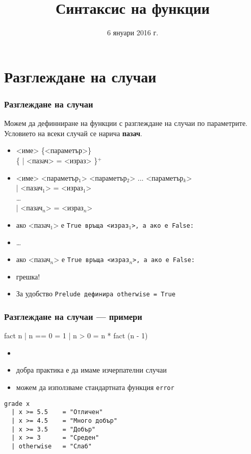 \documentclass{beamer}
\title{Синтаксис на функции}
\date{6 януари 2016 г.}
\begin{document}
\begin{frame}
  \titlepage
\end{frame}


\section{Разглеждане на случаи}

\begin{frame}[fragile]
  \frametitle{Разглеждане на случаи}
  Можем да дефинниране на функции с разглеждане на случаи по параметрите.\\
  Условието на всеки случай се нарича \textbf{пазач}.
  \begin{itemize}
    \item{} <име> \{<параметър>\}\\
      \hspace{3ex} \{ \tta| <пазач> \tta= <израз> \}$^+$
      \pause
    \item{} <име> <параметър$_1$> <параметър$_2$> ... <параметър$_k$>\\
      \hspace{3ex} \tta| <пазач$_1$> \tta= <израз$_1$>\\
      \hspace{3ex} \ldots\\
      \hspace{3ex} \tta| <пазач$_n$> \tta= <израз$_n$>\\
      \pause
    \item ако <пазач$_1$> е \tt{True} връща <израз$_1$>, а ако е \tt{False}:
    \item \ldots
    \item ако <пазач$_n$> е \tt{True} връща <израз$_n$>, а ако е \tt{False}:
    \item \alert{грешка!}
      \pause
    \item За удобство \tt{Prelude} дефинира \tt{otherwise = True}
  \end{itemize}
\end{frame}

\begin{frame}[fragile]
  \frametitle{Разглеждане на случаи --- примери}
\begin{semiverbatim}
fact n
  | n == 0    = 1
  | n > 0     = n * fact (n - 1)
\end{semiverbatim}
\onslide<+->
\begin{itemize}[<+->]
\item {}
\item добра практика е да имаме изчерпателни случаи
\item можем да използваме стандартната функция \tt{error}
\end{itemize}
\onslide<+->
\onslide<+->
\begin{verbatim}
grade x
  | x >= 5.5    = "Отличен"
  | x >= 4.5    = "Много добър"
  | x >= 3.5    = "Добър"
  | x >= 3      = "Среден"
  | otherwise   = "Слаб"
\end{verbatim}
\end{frame}
\end{document}
